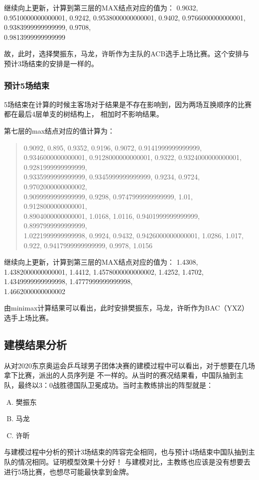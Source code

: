 \documentclass[a4paper,AutoFakeBold,AutoFakeSlant]{ctexart}
\begin{document}
继续向上更新，计算到第三层的MAX结点对应的值为：
 0.9032,
 0.9510000000000001,
 0.9242,
 0.9538000000000001,
 0.9402,
 0.9766000000000001,
 0.9383999999999999,
 0.9708,\\
 0.9813999999999999

故，此时，选择樊振东，马龙，许昕作为主队的ACB选手上场比赛。这个安排与预计3场结束的安排是一样的。

\subsubsection{预计5场结束}
5场结束在计算的时候主客场对于结果是不存在影响到，因为两场互换顺序的比赛都在最后4层单支的树结构上，
相加时不影响结果。

第七层的max结点对应的值计算为：
\begin{quote}
  0.9092,
 0.895,
 0.9352,
 0.9196,
 0.9072,
 0.9141999999999999,
 0.9346000000000001,
 0.9128000000000001,
 0.9322,
 0.9324000000000001,
 0.9281999999999999,\\
 0.9335999999999999,
 0.9345999999999999,
 0.9234,
 0.9724,
 0.9702000000000002,\\
 0.9099999999999999,
 0.9298,
 0.9747999999999999,
 1.01,
 0.9128000000000001,\\
 0.8904000000000001,
 1.0168,
 1.0116,
 0.9401999999999999,
 0.8997999999999999,\\
 1.0221999999999998,
 0.9924,
 0.9432,
 0.9426000000000001,
 1.0286,
 1.017,
 0.922,
 0.9417999999999999,
 0.9978,
 1.0156
\end{quote}

继续向上更新，计算到第三层的MAX结点对应的值为：
1.4308,
 1.4382000000000001,
 1.4412,
 1.4578000000000002,
 1.4252,
 1.4702,
 1.4349999999999998,
 1.4777999999999998,\\
 1.4662000000000002

由minimax计算结果可以看出，此时安排樊振东，马龙，许昕作为BAC（YXZ）选手上场比赛。

\subsection{建模结果分析}
从对2020东京奥运会乒乓球男子团体决赛的建模过程中可以看出，对于想要在几场拿下比赛，派出的人员序列是
不一样的。从当时的赛况结果看，中国队抽到主队，最终以3：0战胜德国队卫冕成功。当时主教练排出的阵型就是：
\begin{enumerate}[A.]
  \item 樊振东
  \item 马龙
  \item 许昕
\end{enumerate}
与建模过程中分析的预计3场结束的阵容完全相同，也与预计4场结束中国队抽到主队的情况相同。证明模型效果十分好！
与建模对比，主教练也应该是没有想要去进行5场比赛，也想尽可能最快拿到金牌。
\end{document}

